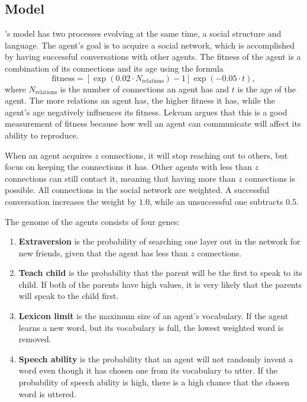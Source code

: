 \subsection{Model} 
\citeauthor{lekvam2014co}'s model has two processes evolving at the same time, a social structure and language. The agent's goal is to acquire a social network, which is accomplished by having successful conversations with other agents. The fitness of the agent is a combination of its connections and its age using the formula
\begin{equation}
    \mathrm{fitness} = [\exp(0.02 \cdot N_\mathrm{relations}) - 1] \exp(-0.05 \cdot t),
\end{equation}
where $N_\mathrm{relations}$ is the number of connections an agent has and $t$ is the age of the agent. The more relations an agent has, the higher fitness it has, while the agent's age negatively influences its fitness. Lekvam argues that this is a good measurement of fitness because how well an agent can communicate will affect its ability to reproduce. 

When an agent acquires $z$ connections, it will stop reaching out to others, but focus on keeping the connections it has. Other agents with less than $z$ connections can still contact it, meaning that having more than $z$ connections is possible. All connections in the social network are weighted. A successful conversation increases the weight by $1.0$, while an unsuccessful one subtracts $0.5$. 

The genome of the agents consists of four genes:
\begin{enumerate}
    \item \textbf{Extraversion} is the probability of searching one layer out in the network for new friends, given that the agent has less than $z$ connections.
    
    \item \textbf{Teach child} is the probability that the parent will be the first to speak to its child. If both of the parents have high values, it is very likely that the parents will speak to the child first.
    
    \item \textbf{Lexicon limit} is the maximum size of an agent's vocabulary. If the agent learns a new word, but its vocabulary is full, the lowest weighted word is removed.
    
    \item \textbf{Speech ability} is the probability that an agent will not randomly invent a word even though it has chosen one from its vocabulary to utter. If the probability of speech ability is high, there is a high chance that the chosen word is uttered.
\end{enumerate}

